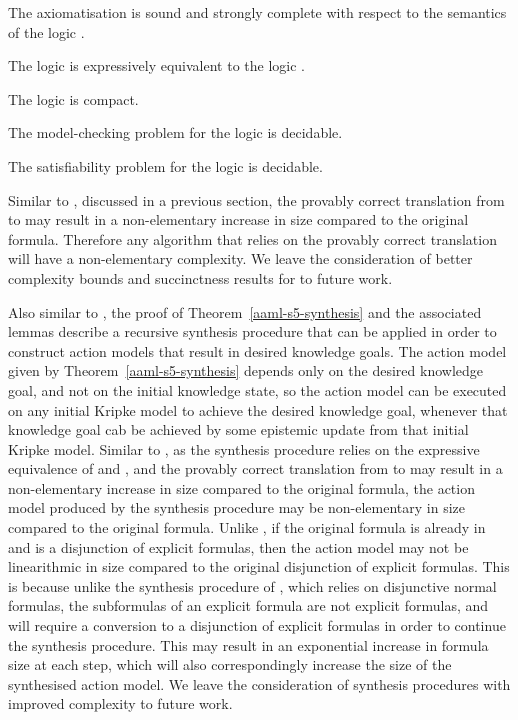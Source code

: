 \begin{corollary}
The axiomatisation \axiomRamlS{} is sound and strongly complete with respect to the semantics of the logic \logicAamlS{}.
\end{corollary}

\begin{corollary}
The logic \logicAamlS{} is expressively equivalent to the logic \logicS{}.
\end{corollary}

\begin{corollary}
The logic \logicAamlS{} is compact.
\end{corollary}

\begin{corollary}
The model-checking problem for the logic \logicAamlS{} is decidable.
\end{corollary}

\begin{corollary}
The satisfiability problem for the logic \logicAamlS{} is decidable.
\end{corollary}

Similar to \logicAamlK{}, discussed in a previous section, the provably correct translation from \langAaml{} to \langMl{} may result in a non-elementary increase in size compared to the original formula.
Therefore any algorithm that relies on the provably correct translation will have a non-elementary complexity.
We leave the consideration of better complexity bounds and succinctness results for \logicAamlS{} to future work.

Also similar to \logicAamlK{}, the proof of Theorem~\ref{aaml-s5-synthesis} and the associated lemmas describe a recursive synthesis procedure that can be applied in order to construct action models that result in desired knowledge goals.
The action model given by Theorem~\ref{aaml-s5-synthesis} depends only on the desired knowledge goal, and not on the initial knowledge state, so the action model can be executed on any initial Kripke model to achieve the desired knowledge goal, whenever that knowledge goal cab be achieved by some epistemic update from that initial Kripke model.
Similar to \logicAamlK{}, as the synthesis procedure relies on the expressive equivalence of \logicRamlS{} and \logicS{}, and the provably correct translation from \langAaml{} to \langMl{} may result in a non-elementary increase in size compared to the original formula, the action model produced by the synthesis procedure may be non-elementary in size compared to the original formula.
Unlike \logicAamlK{}, if the original formula is already in \langMl{} and is a disjunction of explicit formulas, then the action model may not be linearithmic in size compared to the original disjunction of explicit formulas.
This is because unlike the synthesis procedure of \logicAamlK{}, which relies on disjunctive normal formulas, the subformulas of an explicit formula are not explicit formulas, and will require a conversion to a disjunction of explicit formulas in order to continue the synthesis procedure.
This may result in an exponential increase in formula size at each step, which will also correspondingly increase the size of the synthesised action model.
We leave the consideration of synthesis procedures with improved complexity to future work.
